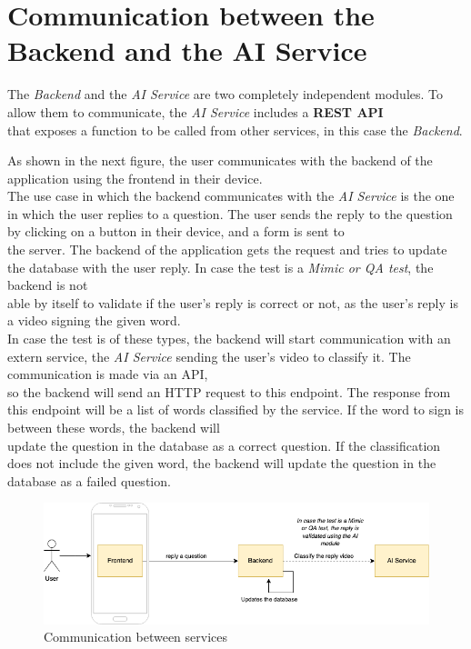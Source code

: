     \section{Communication between the Backend and the AI Service}
    The \textit{Backend} and the \textit{AI Service} are two completely independent modules. To allow them to communicate, the \textit{AI Service} includes a \textbf{REST API} \\
    that exposes a function to be called from other services, in this case the \textit{Backend}. 

    As shown in the next figure, the user communicates with the backend of the application using the frontend in their device. \\
    
    The use case in which the backend communicates with the \textit{AI Service} is the one in which the user replies to a question. The user sends the reply to the question by clicking on a button in their device, and a form is sent to \\
    the server. The backend of the application gets the request and tries to update the database with the user reply. In case the test is a \textit{Mimic or QA test}, the backend is not \\
    able by itself to validate if the user's reply is correct or not, as the user's reply is a video signing the given word. \\

    In case the test is of these types, the backend will start communication with an extern service, the \textit{AI Service} sending the user's video to classify it. The communication is made via an API, \\
    so the backend will send an HTTP request to this endpoint. The response from this endpoint will be a list of words classified by the service. If the word to sign is between these words, the backend will \\
    update the question in the database as a correct question. If the classification does not include the given word, the backend will update the question in the database as a failed question.
    \begin{figure}[H]
        \centering
            \includegraphics[width=\textwidth]{assets/diagrams/comm.png}
        \caption{Communication between services}
        \label{fig:impl_comm}
    \end{figure}


